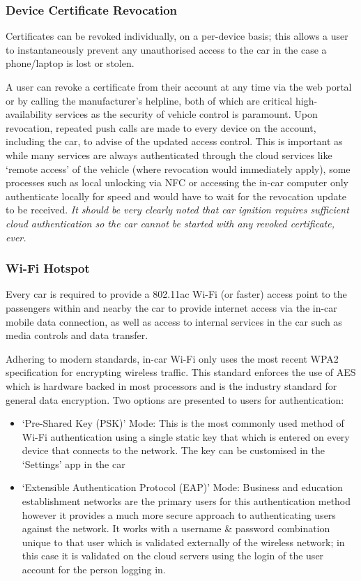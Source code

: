 \documentclass{article}
\begin{document}
\subsubsection{Device Certificate Revocation}
Certificates can be revoked individually, on a per-device basis; this allows a user to instantaneously prevent any unauthorised access to the car in the case a phone/laptop is lost or stolen.

A user can revoke a certificate from their account at any time via the web portal or by calling the manufacturer's helpline, both of which are critical high-availability services as the security of vehicle control is paramount. Upon revocation, repeated push calls are made to every device on the account, including the car, to advise of the updated access  control. This is important as while many services are always authenticated through the cloud services like `remote access' of the vehicle (where revocation would immediately apply), some processes such as local unlocking via NFC or accessing the in-car computer only authenticate locally for speed and would have to wait for the revocation update to be received. \textit{It should be very clearly noted that car ignition requires sufficient cloud authentication so the car cannot be started with any revoked certificate, ever.}

\subsubsection{Wi-Fi Hotspot}
Every car is required to provide a 802.11ac Wi-Fi (or faster) access point to the passengers within and nearby the car to provide internet access via the in-car mobile data connection, as well as access to internal services in the car such as media controls and data transfer.

Adhering to modern standards, in-car Wi-Fi only uses the most recent WPA2 specification for encrypting wireless traffic. This standard enforces the use of AES which is hardware backed in most processors and is the industry standard for general data encryption. Two options are presented to users for authentication:
\begin{itemize}
  \item `Pre-Shared Key (PSK)' Mode: This is the most commonly used method of Wi-Fi authentication using a single static key that which is entered on every device that connects to the network. The key can be customised in the `Settings' app in the car
  \item `Extensible Authentication Protocol (EAP)' Mode: Business and education establishment networks are the primary users for this authentication method however it provides a much more secure approach to authenticating users against the network. It works with a username \& password combination unique to that user which is validated externally of the wireless network; in this case it is validated on the cloud servers using the login of the user account for the person logging in.
\end{itemize}
\end{document}
